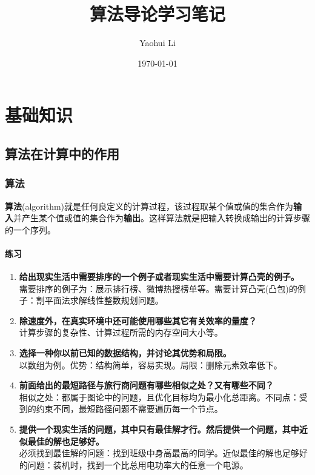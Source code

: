 \documentclass[UTF8,a4paper,zihao=-4,oneside,onecolumn,scheme=chinese,autoindent=true]{ctexbook}
\title{算法导论学习笔记}
\author{Yaohui Li}
\date{\today}
\begin{document}
\maketitle

\tableofcontents

\part{基础知识}

\chapter{算法在计算中的作用}
\section{算法}
\textbf{算法}(algorithm)就是任何良定义的计算过程，该过程取某个值或值的集合作为\textbf{输入}并产生某个值或值的集合作为\textbf{输出}。这样算法就是把输入转换成输出的计算步骤的一个序列。

\subsection*{练习}
\begin{enumerate}
    \renewcommand{\labelenumi}{\thesection-\theenumi}
    \item {\textbf{给出现实生活中需要排序的一个例子或者现实生活中需要计算凸壳的例子。}\\需要排序的例子为：展示排行榜、微博热搜榜单等。需要计算凸壳(凸包)的例子：割平面法求解线性整数规划问题。}
    \item {\textbf{除速度外，在真实环境中还可能使用哪些其它有关效率的量度？}\\计算步骤的复杂性、计算过程所需的内存空间大小等。}
    \item {\textbf{选择一种你以前已知的数据结构，并讨论其优势和局限。}\\以数组为例。优势：结构简单，容易实现。局限：删除元素效率低下。}
    \item {\textbf{前面给出的最短路径与旅行商问题有哪些相似之处？又有哪些不同？}\\相似之处：都属于图论中的问题，且优化目标均为最小化总距离。不同点：受到的约束不同，最短路径问题不需要遍历每一个节点。}
    \item {\textbf{提供一个现实生活的问题，其中只有最佳解才行。然后提供一个问题，其中近似最佳的解也足够好。}\\必须找到最佳解的问题：找到班级中身高最高的同学。近似最佳的解也足够好的问题：装机时，找到一个比总用电功率大的任意一个电源。}
\end{enumerate}
\end{document}
